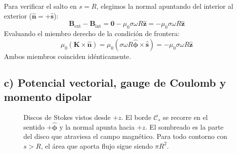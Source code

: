 \documentclass[11pt]{article}
\begin{document}
Para verificar el salto en $s = R$, elegimos la normal apuntando del interior al exterior ($\hat{\mathbf{n}} = +\hat{\mathbf{s}}$):
\begin{equation}
    \mathbf{B}_{\text{ext}} - \mathbf{B}_{\text{int}} = \mathbf{0} - \mu_0 \sigma \omega R \hat{\mathbf{z}} = -\mu_0 \sigma \omega R \hat{\mathbf{z}}
\end{equation}
Evaluando el miembro derecho de la condición de frontera:
\begin{equation}
    \mu_0 (\mathbf{K} \times \hat{\mathbf{n}}) = \mu_0 (\sigma \omega R \hat{\boldsymbol{\phi}} \times \hat{\mathbf{s}}) = -\mu_0 \sigma \omega R \hat{\mathbf{z}}
\end{equation}
Ambos miembros coinciden idénticamente.

\subsection*{c) Potencial vectorial, gauge de Coulomb y momento dipolar}
\begin{figure}[H]
\centering
{}
\caption{Discos de Stokes vistos desde $+z$. El borde $\mathcal C_s$
se recorre en el sentido $+\hat{\boldsymbol\phi}$ y la normal
apunta hacia $+z$. El sombreado es la parte del disco que atraviesa
el campo magnético. Para todo contorno con $s>R$, el área que
aporta flujo sigue siendo $\pi R^2$.}
\label{fig:e2-cilindro-stokes}
\end{figure}
\end{document}
